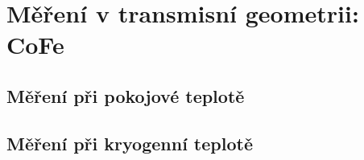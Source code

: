 \section{Měření v transmisní geometrii: CoFe}
\label{chap:vysledky-cofe}

\subsection{Měření při pokojové teplotě}

\subsection{Měření při kryogenní teplotě}
\label{chap:vysledky-cofe-lowt}
